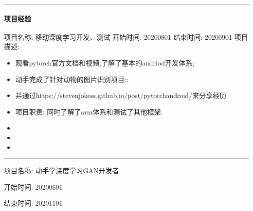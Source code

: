 \documentclass[letterpaper,11pt,english]{sphinxmanual}
\begin{document}
\bigskip\hrule\bigskip



\paragraph{项目经验}
\label{\detokenize{get_started:id5}}
项目名称: 移动深度学习开发、测试 开始时间: 2020\sphinxhyphen{}08\sphinxhyphen{}01 结束时间:
2020\sphinxhyphen{}09\sphinxhyphen{}01 项目描述:
\begin{itemize}
\item {} 
观看pytorch官方文档和视频,了解了基本的andriod开发体系;

\item {} 
动手完成了针对动物的图片识别项目:;

\item {} 
并通过https://stevenjokess.github.io/post/pytorch\sphinxhyphen{}android/来分享经历

\item {} 
项目职责: 同时了解了arm体系和测试了其他框架:

\item {} 

\item {} 

\item {} 

\end{itemize}


\bigskip\hrule\bigskip


项目名称: 动手学深度学习GAN开发者

开始时间: 2020\sphinxhyphen{}06\sphinxhyphen{}01

结束时间: 2020\sphinxhyphen{}11\sphinxhyphen{}01
\end{document}
